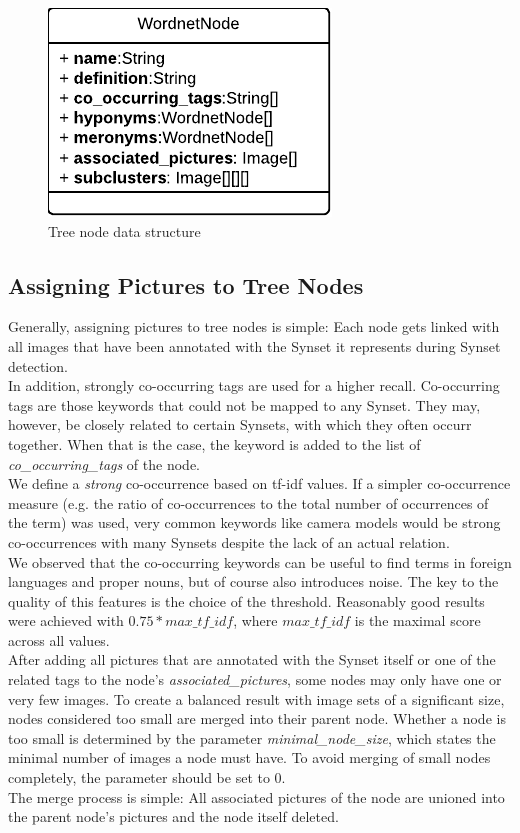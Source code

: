 \begin{figure}[h]
\centering
\includegraphics[]{images/wordnetnode_class_diagram.pdf}
\caption{Tree node data structure}
\label{fig_nodestructure}
\end{figure}


\subsection{Assigning Pictures to Tree Nodes}
\label{sec_picturestonodes}
Generally, assigning pictures to tree nodes is simple: Each node gets linked with all images that have been annotated with the Synset it represents during Synset detection. \\
In addition, strongly co-occurring tags are used for a higher recall. Co-occurring tags are those keywords that could not be mapped to any Synset. They may, however, be closely related to certain Synsets, with which they often occurr together. When that is the case, the keyword is added to the list of \emph{co\_occurring\_tags} of the node. \\
We define a \emph{strong} co-occurrence based on tf-idf  values. If a simpler co-occurrence measure (e.g. the ratio of co-occurrences to the total number of occurrences of the term) was used, very common keywords like camera models would be strong co-occurrences with many Synsets despite the lack of an actual relation. \\
We observed that the co-occurring keywords can be useful to find terms in foreign languages and proper nouns, but of course also introduces noise. The key to the quality of this features is the choice of the threshold. Reasonably good results were achieved with $0.75 * max\_tf\_idf$, where $max\_tf\_idf$ is the maximal score across all values. \\

After adding all pictures that are annotated with the Synset itself or one of the related tags to the node's \emph{associated\_pictures}, some nodes may only have one or very few images. To create a balanced result with image sets of a significant size, nodes considered too small are merged into their parent node. Whether a node is too small is determined by the parameter \emph{minimal\_node\_size}, which states the minimal number of images a node must have. To avoid merging of small nodes completely, the parameter should be set to 0.\\ 
The merge process is simple: All associated pictures of the node are unioned into the parent node's pictures and the node itself deleted. 

